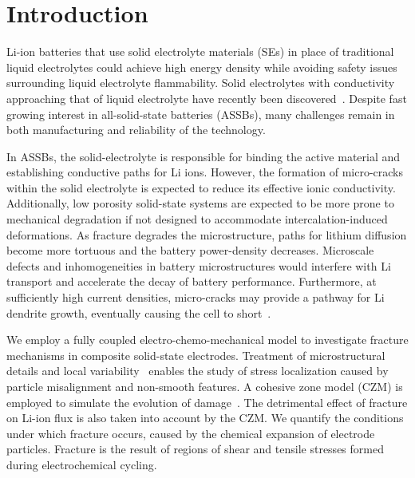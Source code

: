 \documentclass[final,5p,sort&compress]{elsarticle}
\begin{document}
\section{Introduction}

Li-ion batteries that use solid electrolyte materials (SEs) in place of traditional liquid electrolytes could achieve high energy density while avoiding safety issues surrounding liquid electrolyte flammability.
Solid electrolytes with conductivity approaching that of liquid electrolyte have recently been discovered~\cite{Takada:2013,Li2015, Kim2015, ASSBgarnet_rev2014, C0CS00081G, Takada2014, Tatsumisago2013}. 
Despite fast growing interest in all-solid-state batteries (ASSBs), many challenges remain in both manufacturing and reliability of the technology. 

In ASSBs, the solid-electrolyte is responsible for binding the active material and establishing conductive paths for Li ions. 
However, the formation of micro-cracks within the solid electrolyte is expected to reduce its effective ionic conductivity.
Additionally,
low porosity solid-state systems are expected to be more prone to mechanical degradation if not designed to accommodate intercalation-induced deformations.
As fracture degrades the microstructure, paths for lithium diffusion become more tortuous and the battery power-density decreases.
Microscale defects and inhomogeneities in battery microstructures would  interfere with Li transport and accelerate the decay of battery performance.
Furthermore, at sufficiently high current densities, micro-cracks may provide a pathway for Li dendrite growth, eventually causing the cell to short~\cite{Suzuki2015172}.

We employ a fully coupled electro-chemo-mechanical model to investigate fracture mechanisms
in composite solid-state electrodes. 
%
Treatment of microstructural details and local variability~\cite{bucciActaMat2015} enables the study of stress localization caused by
particle misalignment and non-smooth features. 
A cohesive zone model (CZM) is employed to simulate the evolution of damage~\cite{bucci2016book}. The detrimental effect of fracture on Li-ion flux is also taken into account by the CZM.
We quantify the conditions under which fracture occurs, caused by the chemical expansion of electrode particles.
Fracture is the result of 
regions of shear and tensile stresses formed during electrochemical cycling.
\end{document}
